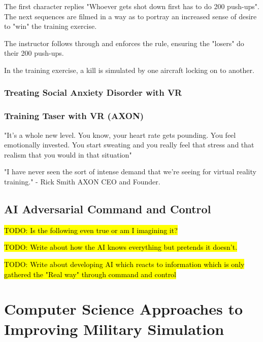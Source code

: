 \documentclass{article}
\begin{document}
The first character replies "Whoever gets shot down first has to do 200 push-ups". The next sequences are filmed in a way as to portray an increased sense of desire to "win" the training exercise. 


The instructor follows through and enforces the rule, ensuring the "losers" do their 200 push-ups.

In the training exercise, a kill is simulated by one aircraft locking on to another.


\subsubsection{Treating Social Anxiety Disorder with VR}

\subsubsection{Training Taser with VR (AXON)}


"It's a whole new level. You know, your heart rate gets pounding. You feel emotionally invested. You start sweating and you really feel that stress and that realism that you would in that situation"

"I have never seen the sort of intense demand that we're seeing for virtual reality training." - Rick Smith AXON CEO and Founder.


\subsection{AI Adversarial Command and Control}

\hl{TODO: Is the following even true or am I imagining it?}

\hl{TODO: Write about how the AI knows everything but pretends it doesn't.}

\hl{TODO: Write about developing AI which reacts to information which is only gathered the "Real way" through command and control}

\section{Computer Science Approaches to Improving Military Simulation}
\end{document}
